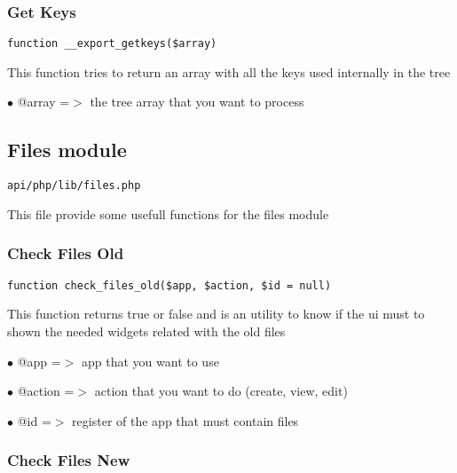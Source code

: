 \documentclass[a4paper]{article}
\begin{document}
\hypertarget{toc444}{}
\subsubsection{Get Keys}

\begin{lstlisting}
function __export_getkeys($array)
\end{lstlisting}

This function tries to return an array with all the keys used internally
in the tree

\begin{compactitem}
\item[\color{myblue}$\bullet$] @array =$>$ the tree array that you want to process
\end{compactitem}

\hypertarget{toc445}{}
\subsection{Files module}

\begin{lstlisting}
api/php/lib/files.php
\end{lstlisting}

This file provide some usefull functions for the files module

\hypertarget{toc446}{}
\subsubsection{Check Files Old}

\begin{lstlisting}
function check_files_old($app, $action, $id = null)
\end{lstlisting}

This function returns true or false and is an utility to know if the ui
must to shown the needed widgets related with the old files

\begin{compactitem}
\item[\color{myblue}$\bullet$] @app    =$>$ app that you want to use
\item[\color{myblue}$\bullet$] @action =$>$ action that you want to do (create, view, edit)
\item[\color{myblue}$\bullet$] @id     =$>$ register of the app that must contain files
\end{compactitem}

\hypertarget{toc447}{}
\subsubsection{Check Files New}
\end{document}
